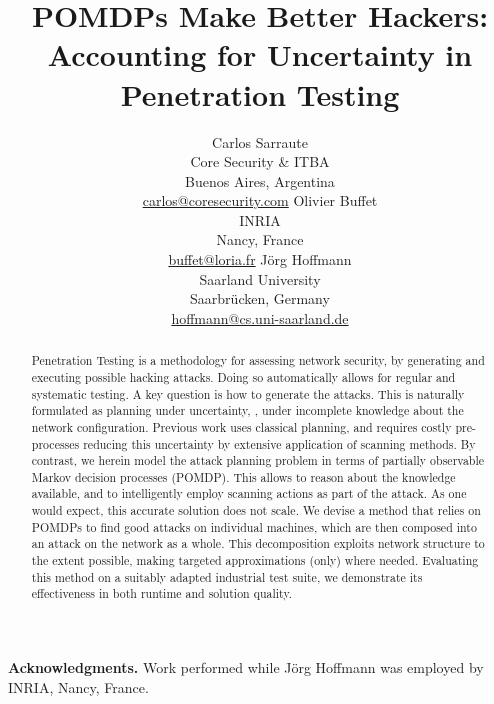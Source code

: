 \documentclass{article}
\title{POMDPs Make Better Hackers:\\ Accounting for Uncertainty in
  Penetration Testing}
\author{
  Carlos Sarraute\\
  Core Security \& ITBA\\
  Buenos Aires, Argentina\\
  \url{carlos@coresecurity.com}
  \And
  Olivier Buffet\\
  INRIA\\
  Nancy, France\\
  \url{buffet@loria.fr}
  \And
  J\"org Hoffmann\\
  Saarland University\\
  Saarbr\"ucken, Germany\\
  \url{hoffmann@cs.uni-saarland.de}
}
\begin{document}
\maketitle

\begin{abstract}
Penetration Testing is a methodology for assessing network security,
by generating and executing possible hacking attacks. Doing so
automatically allows for regular and systematic testing. A key
question is how to generate the attacks. This is naturally formulated
as planning under uncertainty, \ie, under incomplete knowledge about
the network configuration. Previous work uses classical planning, and
requires costly pre-processes reducing this uncertainty by extensive
application of scanning methods. By contrast, we herein model the
attack planning problem in terms of partially observable Markov
decision processes (POMDP). This allows to reason about the knowledge
available, and to intelligently employ scanning actions as part of the
attack. As one would expect, this accurate solution does not scale. We
devise a method that relies on POMDPs to find good attacks on
individual machines, which are then composed into an attack on the
network as a whole. This decomposition exploits network structure to
the extent possible, making targeted approximations (only) where
needed. Evaluating this method on a suitably adapted industrial test
suite, we demonstrate its effectiveness in both runtime and solution
quality.
\end{abstract}














\medskip
\noindent
\textbf{Acknowledgments.} Work performed while J\"org Hoffmann was
employed by INRIA, Nancy, France.
\end{document}
